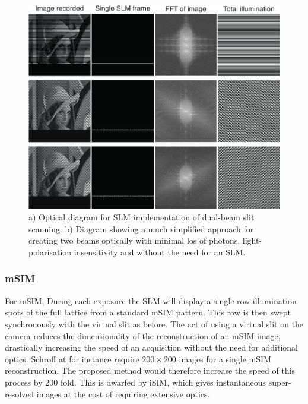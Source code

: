 \begin{figure}
  \centering
  \includegraphics{sim_slit}
  \caption{a) Optical diagram for SLM implementation of dual-beam slit scanning.
           b) Diagram showing a much simplified approach for creating two beams optically with minimal los of photons, light-polarisation insensitivity and without the need for an SLM.}
  \label{fig:sim_slit}
\end{figure}

\subsubsection{mSIM}

For mSIM, During each exposure the SLM will display a single row illumination spots of the full lattice from a standard mSIM pattern.
This row is then swept synchronously with the virtual slit as before.
The act of using a virtual slit on the camera reduces the dimensionality of the reconstruction of an mSIM image, drastically increasing the speed of an acquisition without the need for additional optics.
Schroff at for instance require $200 \times 200$ images for a single mSIM reconstruction.
The proposed method would therefore increase the speed of this process by 200 fold.
This is dwarfed by iSIM, which gives instantaneous super-resolved images at the cost of requiring extensive optics.

